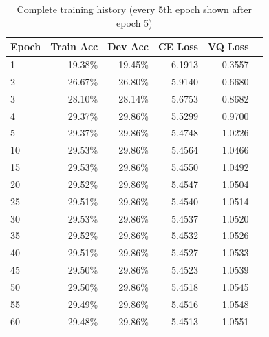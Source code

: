 \documentclass[12pt,a4paper]{article}
\begin{document}
\begin{table}[H]
\centering
\begin{tabular}{lrrrrr}
\toprule
\textbf{Epoch} & \textbf{Train Acc} & \textbf{Dev Acc} & \textbf{CE Loss} & \textbf{VQ Loss} \\
\midrule
1 & 19.38\% & 19.45\% & 6.1913 & 0.3557 \\
2 & 26.67\% & 26.80\% & 5.9140 & 0.6680 \\
3 & 28.10\% & 28.14\% & 5.6753 & 0.8682 \\
4 & 29.37\% & 29.86\% & 5.5299 & 0.9700 \\
5 & 29.37\% & 29.86\% & 5.4748 & 1.0226 \\
10 & 29.53\% & 29.86\% & 5.4564 & 1.0466 \\
15 & 29.53\% & 29.86\% & 5.4550 & 1.0492 \\
20 & 29.52\% & 29.86\% & 5.4547 & 1.0504 \\
25 & 29.51\% & 29.86\% & 5.4540 & 1.0514 \\
30 & 29.53\% & 29.86\% & 5.4537 & 1.0520 \\
35 & 29.52\% & 29.86\% & 5.4532 & 1.0526 \\
40 & 29.51\% & 29.86\% & 5.4527 & 1.0533 \\
45 & 29.50\% & 29.86\% & 5.4523 & 1.0539 \\
50 & 29.50\% & 29.86\% & 5.4518 & 1.0545 \\
55 & 29.49\% & 29.86\% & 5.4516 & 1.0548 \\
60 & 29.48\% & 29.86\% & 5.4513 & 1.0551 \\
\bottomrule
\end{tabular}
\caption{Complete training history (every 5th epoch shown after epoch 5)}
\end{table}
\end{document}
